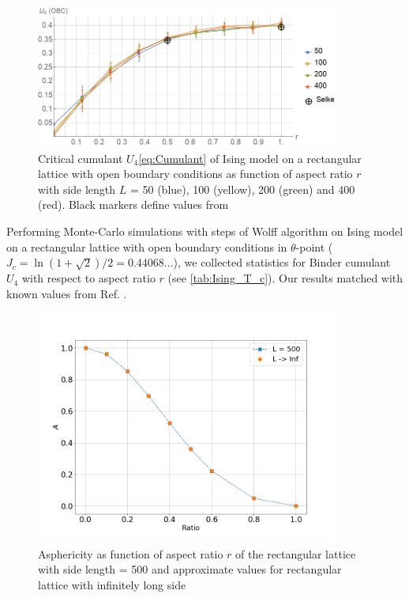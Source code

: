 \documentclass[a4paper]{jpconf}
\begin{document}
\begin{figure}[h]
    \centering
    \includegraphics[width=100mm]{Images/CumulantOBC.png}
    \caption{Critical cumulant $U_{4}$\eqref{eq:Cumulant} of Ising model on a rectangular lattice with open boundary conditions as function of aspect ratio $r$ with side length $L$ = 50 (blue), 100 (yellow), 200 (green) and 400 (red). Black markers define values from \cite{Selke2006}}
    \label{fig:A_r}
\end{figure}

Performing Monte-Carlo simulations with steps of Wolff algorithm \cite{Newmanb1999} on Ising model on a rectangular lattice with open boundary conditions in $\theta$-point ($J_{c} = \ln{(1 + \sqrt{2}) / 2} =  0.44068... $), we collected statistics for Binder cumulant $U_{4}$ with respect to aspect ratio $r$ (see \cref{tab:Ising_T_c}). Our results matched with known values from Ref. \cite{Selke2006}.

\begin{figure}[h]
    \centering
    \includegraphics[width=100mm]{Images/A_r.png}
    \caption{Asphericity as function of aspect ratio $r$ of the rectangular lattice with side length = 500 and approximate values for rectangular lattice with infinitely long side}
    \label{fig:A_r}
\end{figure}
\end{document}
